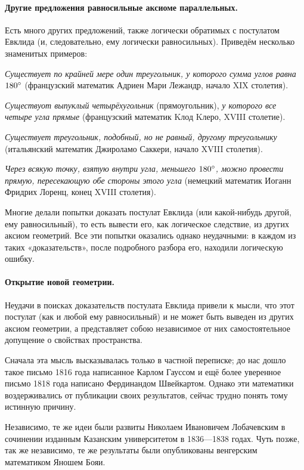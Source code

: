 \paragraph{Другие предложения равносильные аксиоме параллельных.}\label{1914/92}
Есть много других предложений, также логически обратимых с постулатом Евклида (и, следовательно, ему логически равносильных).
Приведём несколько знаменитых примеров:

\emph{Существует по крайней мере один треугольник, у которого сумма углов равна $180\degree$} (французский математик Адриен Мари Лежандр, начало XIX столетия).

\emph{Существуот выпуклый четырёхугольник} (прямоугольник), \emph{у которого все четыре угла прямые} (французский математик Kлод  Kлеро, XVIII столетие).

\emph{Существует треугольник, подобный, но не равный, другому треугольнику} (итальянский математик Джироламо Саккери, начало XVIII столетия).

\emph{Через всякую точку, взятую внутри угла, меньшего $180\degree$, можно
провести прямую, пересекающую обе стороны этого угла} (немецкий
математик Иоганн Фридрих Лоренц, конец XVIII столетия).

Многие делали попытки доказать постулат Евклида
(или какой-нибудь другой, ему равносильный), то есть вывести его,
как логическое следствие, из других аксиом геометрий.
Все эти попытки оказались однако неудачными: в каждом из таких «доказательств», после подробного разбора его, находили логическую ошибку.

\paragraph{Открытие новой геометрии.}\label{1914/93} Неудачи в поисках доказательств
постулата Евклида привели к мысли, что этот постулат (как и любой ему равносильный) и не может быть выведен из других аксиом геометрии, а представляет собою независимое от них самостоятельное допущение о свойствах пространства.

Сначала эта мысль высказывалась только в частной переписке;
до нас дошло такое письмо 1816 года написанное Карлом Гауссом
и ещё более уверенное письмо 1818 года написано Фердинандом Швейкартом.
Однако эти математики воздерживались от публикации своих результатов, сейчас трудно понять тому истинную причину.

Независимо, те же идеи были развиты Николаем Ивановичем Лобачевским в 
сочинении изданным Казанским университетом в 1836—1838 годах.
Чуть позже, так же независимо, те же результаты были опубликованы венгерским математиком Яношем Бояи.

